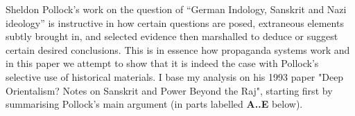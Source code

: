 Sheldon Pollock’s work on the question of “German Indology, Sanskrit and Nazi ideology” is instructive in how certain questions are posed, extraneous elements subtly brought in, and selected evidence then marshalled to deduce or suggest certain desired conclusions. This is in essence how propaganda systems work and in this paper we attempt to show that it is indeed the case with Pollock's selective use of historical materials. I base my analysis on his 1993 paper "Deep Orientalism? Notes on Sanskrit and Power Beyond the Raj", starting first by summarising Pollock's main argument (in parts labelled {\bf A..E} below).
